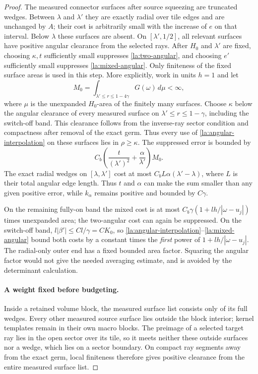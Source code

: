 \begin{proof}
The measured connector surfaces after source squeezing are truncated
wedges.  Between $\lambda$ and $\lambda'$ they are exactly radial
over tile edges and are unchanged by $A$; their cost is arbitrarily
small with the increase of $e$ on that interval.  Below $\lambda$
these surfaces are absent.  On $[\lambda',1/2]$, all relevant
surfaces have positive angular clearance from the selected rays.
After $H_0$ and $\lambda'$ are fixed, choosing $\kappa,t$ sufficiently
small suppresses \eqref{la:two-angular}, and choosing $e'$ sufficiently
small suppresses \eqref{la:mixed-angular}.  Only finiteness of the
fixed surface areas is used in this step.  More explicitly, work in
units $h=1$ and let
\[
 M_0=\int_{\lambda'\le r\le1-4\gamma}G(\omega)\,d\mu<\infty,
\]
where $\mu$ is the unexpanded $H_0$-area of the finitely many surfaces.
Choose $\kappa$ below the angular clearance of every measured
surface on $\lambda'\le r\le1-\gamma$, including the switch-off
band.  This clearance follows from the inverse-ray sector condition
and compactness after removal of the exact germ.  Thus every use of
\eqref{la:angular-interpolation} on these surfaces lies in
$\rho\ge\kappa$.  The suppressed error is bounded by
\[
 C_b\left(\frac{t}{(\lambda')^2}
                +\frac{\alpha}{\lambda'}\right)M_0.
\]
The exact radial wedges on $[\lambda,\lambda']$ cost at most
$C_b L\alpha(\lambda'-\lambda)$, where $L$ is their total angular
edge length.  Thus $t$ and $\alpha$ can make the sum smaller than any
given positive error, while $k_\alpha$ remains positive and bounded
by $C\gamma$.

On the remaining fully-on band the mixed cost is at most
$C_b\gamma(1+lh/|\omega-u_j|)$ times unexpanded area; the
two-angular cost can again be suppressed.  On the switch-off band,
$l|\beta'|\le C l/\gamma=CK_0$, so
\eqref{la:angular-interpolation}--\eqref{la:mixed-angular} bound both
costs by a constant times the \emph{first} power of
$1+lh/|\omega-u_j|$.  The radial-only outer end has a fixed bounded
area factor.  Squaring the angular factor would not give the needed
averaging estimate, and is avoided by the determinant calculation.

\paragraph{A weight fixed before budgeting.}
Inside a retained volume block, the measured surface list consists
only of its full wedges.  Every other measured source surface lies
outside the block interior; kernel templates remain in their own
macro blocks.  The preimage of a selected target ray lies in the
open sector over its tile, so it meets neither these outside
surfaces nor a wedge, which lies on a sector boundary.  On compact
ray segments away from the exact germ, local finiteness therefore
gives positive clearance from the entire measured surface list.


\end{proof}
